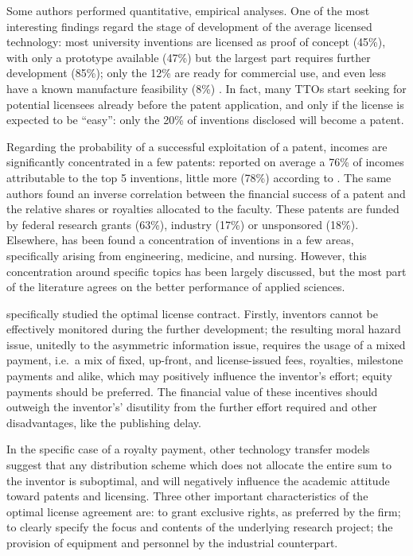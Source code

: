 Some authors performed quantitative, empirical analyses. One of the most interesting findings regard the stage of development of the average licensed technology: most university inventions are licensed as proof of concept (45\%), with only a prototype available (47\%) but the largest part requires further development (85\%); only the 12\% are ready for commercial use, and even less have a known manufacture feasibility (8\%) \citep{Thursby2002}. In fact, many TTOs start seeking for potential licensees already before the patent application, and only if the license is expected to be \enquote{easy}: only the 20\% of inventions disclosed will become a patent.

Regarding the probability of a successful exploitation of a patent, incomes are significantly concentrated in a few patents: \citet{Thursby2002} reported on average a 76\% of incomes attributable to the top 5 inventions, little more (78\%) according to \citet{Jensen2003}. The same authors found an inverse correlation between the financial success of a patent and the relative shares or royalties allocated to the faculty. These patents are funded by federal research grants (63\%), industry (17\%) or unsponsored (18\%). Elsewhere, has been found a concentration of inventions in a few areas, specifically arising from engineering, medicine, and nursing. However, this concentration around specific topics has been largely discussed, but the most part of the literature agrees on the better performance of applied sciences. 

\citet{Jensen2003} specifically studied the optimal license contract. Firstly, inventors cannot be effectively monitored during the further development; the resulting moral hazard issue, unitedly to the asymmetric information issue, requires the usage of a mixed payment, i.e.\ a mix of fixed, up-front, and license-issued fees, royalties, milestone payments and alike, which may positively influence the inventor's effort; equity payments should be preferred. The financial value of these incentives should outweigh the inventor's' disutility from the further effort required and other disadvantages, like the publishing delay. 

In the specific case of a royalty payment, other technology transfer models suggest that any distribution scheme which does not allocate the entire sum to the inventor is suboptimal, and will negatively influence the academic attitude toward patents and licensing. Three other important characteristics of the optimal license agreement are: to grant exclusive rights, as preferred by the firm; to clearly specify the focus and contents of the underlying research project; the provision of equipment and personnel by the industrial counterpart. 

